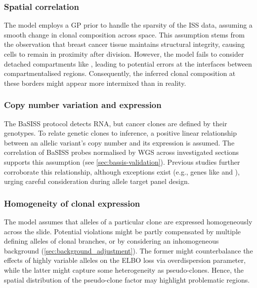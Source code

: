 \subsubsection*{Spatial correlation}
The model employs a \ac{GP} prior to handle the sparsity of the \ac{ISS} data, assuming a smooth change in clonal composition across space. This assumption stems from the observation that breast cancer tissue maintains structural integrity, causing cells to remain in proximity after division. However, the model fails to consider detached compartments like , leading to potential errors at the interfaces between compartmentalised regions. Consequently, the inferred clonal composition at these borders might appear more intermixed than in reality. 

\subsubsection*{Copy number variation and expression}
The \ac{BaSISS} protocol detects RNA, but cancer clones are defined by their genotypes. To relate genetic clones to inference, a positive linear relationship between an allelic variant's copy number and its expression is assumed. The correlation of \ac{BaSISS} probes normalised by \ac{WGS} across investigated sections supports this assumption (see \cref{sec:bassis-validation}). Previous studies further corroborate this relationship, although exceptions exist (e.g., genes like  and ), urging careful consideration during allele target panel design.

\subsubsection*{Homogeneity of clonal expression}
The model assumes that alleles of a particular clone are expressed homogeneously across the slide. Potential violations might be partly compensated by multiple defining alleles of clonal branches, or by considering an inhomogeneous background (\cref{sec:background_adjustment}). The former might counterbalance the effects of highly variable alleles on the \ac{ELBO} loss via overdispersion parameter, while the latter might capture some heterogeneity as pseudo-clones. Hence, the spatial distribution of the pseudo-clone factor may highlight problematic regions. 

